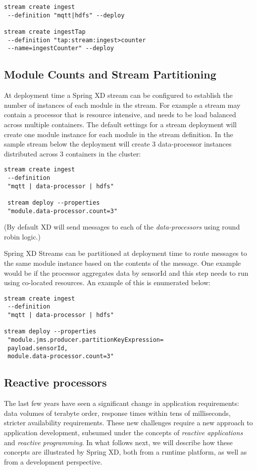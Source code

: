 \begin{lstlisting}
stream create ingest
 --definition "mqtt|hdfs" --deploy

stream create ingestTap
 --definition "tap:stream:ingest>counter
 --name=ingestCounter" --deploy
\end{lstlisting}

\subsection {Module Counts and Stream Partitioning}
At deployment time a Spring XD stream can be configured to establish the number
of instances of each module in the stream. For example a stream may contain
a processor that is resource intensive, and needs to be
load balanced across multiple containers. The default
settings for a stream deployment will create one module instance for each
module in the stream definition. In the sample stream below the
deployment will create 3 data-processor instances distributed
across 3 containers in the cluster:

\begin{lstlisting}
stream create ingest
 --definition
 "mqtt | data-processor | hdfs"

 stream deploy --properties
 "module.data-processor.count=3"
\end{lstlisting}

(By default XD will send messages to each of the \emph{data-processors}
using round robin logic.)

Spring XD Streams can be partitioned at deployment time to route messages to the
same module instance based on the contents of the message. One example
would be if the processor aggregates data by sensorId and this step needs to
run using co-located resources.  An example of this is enumerated below:

\begin{lstlisting}
stream create ingest
 --definition
 "mqtt | data-processor | hdfs"

stream deploy --properties
 "module.jms.producer.partitionKeyExpression=
 payload.sensorId,
 module.data-processor.count=3"
\end{lstlisting}

\subsection {Reactive processors}

The last few years have seen a significant change in application requirements:
data volumes of terabyte order, response times within tens of milliseconds, stricter
availability requirements. These new challenges require a new approach to application
development, subsumed under the concepts of \emph{reactive applications} and \emph{reactive
programming}. In what follows next, we will describe how these concepts are
illustrated by Spring XD, both from a runtime platform, as well as from a development perspective.

